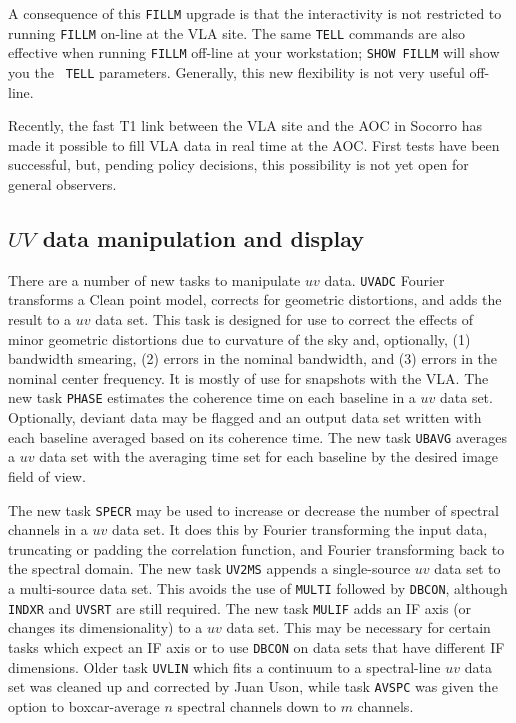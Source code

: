 A consequence of this {\tt FILLM} upgrade is that the interactivity is
not restricted to running {\tt FILLM} on-line at the VLA site.  The
same {\tt TELL} commands are also effective when running {\tt FILLM}
off-line at your workstation; {\tt SHOW FILLM} will show you the {\tt
TELL} parameters.  Generally, this new flexibility is not very useful
off-line.

Recently, the fast T1 link between the VLA site and the AOC in Socorro
has made it possible to fill VLA data in real time at the
\hbox{{AOC}}.  First tests have been successful, but, pending policy
decisions, this possibility is not yet open for general observers.

\subsection{$UV$ data manipulation and display}

There are a number of new tasks to manipulate $uv$ data.  {\tt UVADC}
Fourier transforms a Clean point model, corrects for geometric
distortions, and adds the result to a $uv$ data set.  This task is
designed for use to correct the effects of minor geometric distortions
due to curvature of the sky and, optionally, (1) bandwidth smearing,
(2) errors in the nominal bandwidth, and (3) errors in the nominal
center frequency.  It is mostly of use for snapshots with the
\hbox{{VLA}}.  The new task {\tt PHASE} estimates the coherence time
on each baseline in a $uv$ data set.  Optionally, deviant data may be
flagged and an output data set written with each baseline averaged
based on its coherence time.  The new task {\tt UBAVG} averages a $uv$
data set with the averaging time set for each baseline by the desired
image field of view.

The new task {\tt SPECR} may be used to increase or decrease the
number of spectral channels in a $uv$ data set.  It does this by
Fourier transforming the input data, truncating or padding the
correlation function, and Fourier transforming back to the spectral
domain.  The new task {\tt UV2MS} appends a single-source $uv$ data
set to a multi-source data set.  This avoids the use of {\tt MULTI}
followed by {\tt DBCON}, although {\tt INDXR} and {\tt UVSRT} are
still required.  The new task {\tt MULIF} adds an IF axis (or changes
its dimensionality) to a $uv$ data set.  This may be necessary for
certain tasks which expect an IF axis or to use {\tt DBCON} on data
sets that have different IF dimensions.  Older task {\tt UVLIN} which
fits a continuum to a spectral-line $uv$ data set was cleaned up and
corrected by Juan Uson, while task {\tt AVSPC} was given the option to
boxcar-average $n$ spectral channels down to $m$ channels.

